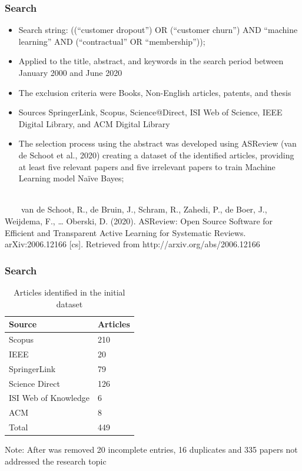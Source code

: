\documentclass[10pt]{beamer}
\begin{document}
\begin{frame}
	\frametitle{Search }
	\begin{itemize}
		\item Search string: ((“customer dropout”) OR (“customer churn”) AND “machine learning” AND (“contractual” OR “membership”));
		\item Applied to the title, abstract, and keywords in the search period between January 2000 and June 2020
		\item The exclusion criteria were Books, Non-English articles, patents, and thesis
		\item Sources SpringerLink, Scopus, Science@Direct, ISI Web of Science, IEEE Digital Library, and ACM Digital Library
		\item The selection process using the abstract was developed using ASReview (van de Schoot et al., 2020) creating a dataset of the identified articles, providing at least five relevant papers and five irrelevant papers to train Machine Learning model Naïve Bayes;
		\\~\\
	\end{itemize}
		\tiny 
		~~~~van de Schoot, R., de Bruin, J., Schram, R., Zahedi, P., de Boer, J., Weijdema, F., … Oberski, D. (2020). ASReview: Open Source Software for Efficient and Transparent Active Learning for Systematic Reviews. arXiv:2006.12166 [cs]. Retrieved from http://arxiv.org/abs/2006.12166 \\
\end{frame}

\begin{frame}
	\frametitle{Search }
	\begin{center}
		\begin{table}
		  \centering
		  \scriptsize
		  \caption{Articles identified in the initial dataset}
		    \begin{tabular}{p{4cm} p{2cm}}
			    \toprule
			    Source & Articles\\
			    \midrule
				Scopus & 210 \\ 
				IEEE &  20	\\ 
				SpringerLink & 79 \\ 
				Science Direct & 126 \\ 
				ISI Web of Knowledge & 6\\ 
				ACM & 8 \\ \hline
				Total & 449 \\
				\bottomrule
			\end{tabular}
			\label{Abordagens analisadas}
		\begin{flushleft}
			Note: After was removed 20 incomplete entries, 16 duplicates and 335 papers not addressed the research topic
		\end{flushleft}
		\end{table}
	\end{center}
\end{frame}
\end{document}
